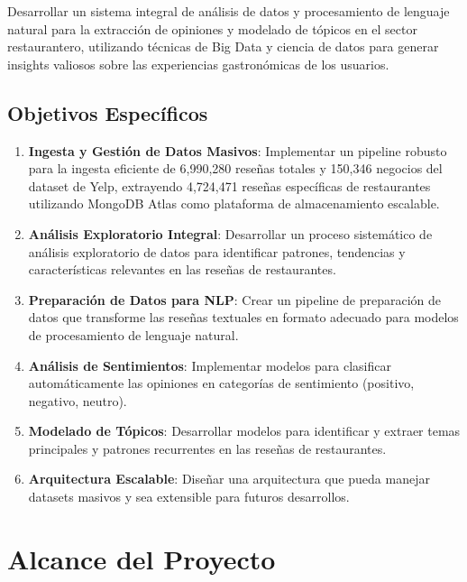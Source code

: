 \documentclass[12pt,a4paper,twoside,openany]{book}
\begin{document}
Desarrollar un sistema integral de análisis de datos y procesamiento de lenguaje natural para la extracción de opiniones y modelado de tópicos en el sector restaurantero, utilizando técnicas de Big Data y ciencia de datos para generar insights valiosos sobre las experiencias gastronómicas de los usuarios.

\subsection{Objetivos Específicos}

\begin{enumerate}
    \item \textbf{Ingesta y Gestión de Datos Masivos}: Implementar un pipeline robusto para la ingesta eficiente de 6,990,280 reseñas totales y 150,346 negocios del dataset de Yelp, extrayendo 4,724,471 reseñas específicas de restaurantes utilizando MongoDB Atlas como plataforma de almacenamiento escalable.
    
    \item \textbf{Análisis Exploratorio Integral}: Desarrollar un proceso sistemático de análisis exploratorio de datos para identificar patrones, tendencias y características relevantes en las reseñas de restaurantes.
    
    \item \textbf{Preparación de Datos para NLP}: Crear un pipeline de preparación de datos que transforme las reseñas textuales en formato adecuado para modelos de procesamiento de lenguaje natural.
    
    \item \textbf{Análisis de Sentimientos}: Implementar modelos para clasificar automáticamente las opiniones en categorías de sentimiento (positivo, negativo, neutro).
    
    \item \textbf{Modelado de Tópicos}: Desarrollar modelos para identificar y extraer temas principales y patrones recurrentes en las reseñas de restaurantes.
    
    \item \textbf{Arquitectura Escalable}: Diseñar una arquitectura que pueda manejar datasets masivos y sea extensible para futuros desarrollos.
\end{enumerate}

\section{Alcance del Proyecto}
\end{document}
